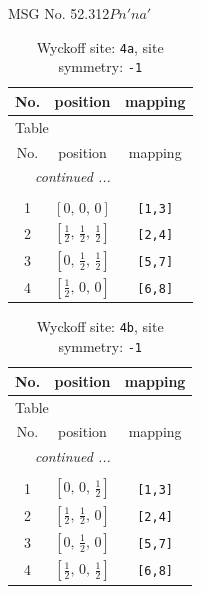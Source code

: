 \documentclass[fleqn,8pt]{jsarticle}
\begin{document}
\setcounter{MaxMatrixCols}{32}

\renewcommand{\tablename}{Table~}
\renewcommand{\figurename}{Figure~}
\begin{center}
\LARGE
MSG No. 52.312\quad$Pn'na'$
\end{center}
\renewcommand{\arraystretch}{1.2}
\begin{longtable}{ccc}
\caption{Wyckoff site: {\tt 4a}, site symmetry: {\tt -1}}
 \\
 \hline \hline
No. & position & mapping \\ \hline \endfirsthead

\multicolumn{2}{l}{\tablename\ \thetable{}} \\
 \hline \hline
No. & position & mapping \\ \hline \endhead

 \hline \hline
\multicolumn{2}{r}{\footnotesize\it continued ...} \\ \endfoot

 \hline \hline
\multicolumn{2}{r}{} \\ \endlastfoot

1 & $\left[ 0,\, 0,\, 0 \right]$ & {\tt [1,3]} \\ \hline
2 & $\left[ \frac{1}{2},\, \frac{1}{2},\, \frac{1}{2} \right]$ & {\tt [2,4]} \\ \hline
3 & $\left[ 0,\, \frac{1}{2},\, \frac{1}{2} \right]$ & {\tt [5,7]} \\ \hline
4 & $\left[ \frac{1}{2},\, 0,\, 0 \right]$ & {\tt [6,8]} \\
\end{longtable}
\renewcommand{\arraystretch}{1.2}
\begin{longtable}{ccc}
\caption{Wyckoff site: {\tt 4b}, site symmetry: {\tt -1}}
 \\
 \hline \hline
No. & position & mapping \\ \hline \endfirsthead

\multicolumn{2}{l}{\tablename\ \thetable{}} \\
 \hline \hline
No. & position & mapping \\ \hline \endhead

 \hline \hline
\multicolumn{2}{r}{\footnotesize\it continued ...} \\ \endfoot

 \hline \hline
\multicolumn{2}{r}{} \\ \endlastfoot

1 & $\left[ 0,\, 0,\, \frac{1}{2} \right]$ & {\tt [1,3]} \\ \hline
2 & $\left[ \frac{1}{2},\, \frac{1}{2},\, 0 \right]$ & {\tt [2,4]} \\ \hline
3 & $\left[ 0,\, \frac{1}{2},\, 0 \right]$ & {\tt [5,7]} \\ \hline
4 & $\left[ \frac{1}{2},\, 0,\, \frac{1}{2} \right]$ & {\tt [6,8]} \\
\end{longtable}
\end{document}
